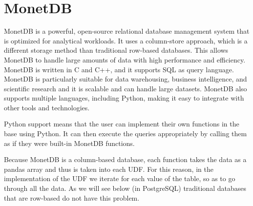 \section{MonetDB}
\label{sec:monet}


MonetDB is a powerful, open-source relational database management system that is optimized for analytical workloads. It uses a column-store approach, which is a different storage method than traditional row-based databases. This allows MonetDB to handle large amounts of data with high performance and efficiency. MonetDB is written in C and C++, and it supports SQL as query language. MonetDB is particularly suitable for data warehousing, business intelligence, and scientific research and it is scalable and can handle large datasets. MonetDB also supports multiple languages, including Python, making it easy to integrate with other tools and technologies.

Python support means that the user can implement their own functions in the base using Python. It can then execute the queries appropriately by calling them as if they were built-in MonetDB functions.

Because MonetDB is a column-based database, each function takes the data as a pandas array and thus is taken into each UDF. For this reason, in the implementation of the UDF we iterate for each value of the table, so as to go through all the data. As we will see below (in PostgreSQL) traditional databases that are row-based do not have this problem.